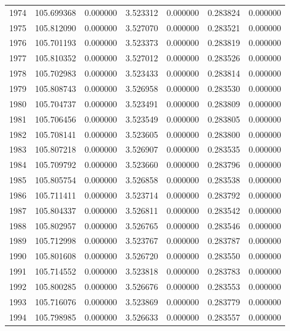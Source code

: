 \begin{tabular}{rrrrrrr}
1974 & 105.699368 &    0.000000 &  3.523312 &   0.000000 &   0.283824 &  0.000000 \\
1975 & 105.812090 &    0.000000 &  3.527070 &   0.000000 &   0.283521 &  0.000000 \\
1976 & 105.701193 &    0.000000 &  3.523373 &   0.000000 &   0.283819 &  0.000000 \\
1977 & 105.810352 &    0.000000 &  3.527012 &   0.000000 &   0.283526 &  0.000000 \\
1978 & 105.702983 &    0.000000 &  3.523433 &   0.000000 &   0.283814 &  0.000000 \\
1979 & 105.808743 &    0.000000 &  3.526958 &   0.000000 &   0.283530 &  0.000000 \\
1980 & 105.704737 &    0.000000 &  3.523491 &   0.000000 &   0.283809 &  0.000000 \\
1981 & 105.706456 &    0.000000 &  3.523549 &   0.000000 &   0.283805 &  0.000000 \\
1982 & 105.708141 &    0.000000 &  3.523605 &   0.000000 &   0.283800 &  0.000000 \\
1983 & 105.807218 &    0.000000 &  3.526907 &   0.000000 &   0.283535 &  0.000000 \\
1984 & 105.709792 &    0.000000 &  3.523660 &   0.000000 &   0.283796 &  0.000000 \\
1985 & 105.805754 &    0.000000 &  3.526858 &   0.000000 &   0.283538 &  0.000000 \\
1986 & 105.711411 &    0.000000 &  3.523714 &   0.000000 &   0.283792 &  0.000000 \\
1987 & 105.804337 &    0.000000 &  3.526811 &   0.000000 &   0.283542 &  0.000000 \\
1988 & 105.802957 &    0.000000 &  3.526765 &   0.000000 &   0.283546 &  0.000000 \\
1989 & 105.712998 &    0.000000 &  3.523767 &   0.000000 &   0.283787 &  0.000000 \\
1990 & 105.801608 &    0.000000 &  3.526720 &   0.000000 &   0.283550 &  0.000000 \\
1991 & 105.714552 &    0.000000 &  3.523818 &   0.000000 &   0.283783 &  0.000000 \\
1992 & 105.800285 &    0.000000 &  3.526676 &   0.000000 &   0.283553 &  0.000000 \\
1993 & 105.716076 &    0.000000 &  3.523869 &   0.000000 &   0.283779 &  0.000000 \\
1994 & 105.798985 &    0.000000 &  3.526633 &   0.000000 &   0.283557 &  0.000000 \\

\end{tabular}
